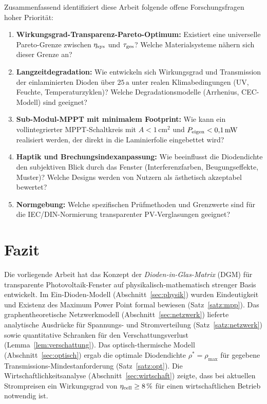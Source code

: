 ﻿\documentclass[a4paper,12pt]{article}
\theoremstyle{definition}
\theoremstyle{remark}
\begin{document}
Zusammenfassend identifiziert diese Arbeit folgende offene Forschungsfragen
hoher Priorität:

\begin{enumerate}
  \item \textbf{Wirkungsgrad-Transparenz-Pareto-Optimum:} Existiert eine
    universelle Pare\-to-Grenze zwischen $\eta_{\rm sys}$ und $\tau_{\rm ges}$?
    Welche Materialsysteme nähern sich dieser Grenze an?

  \item \textbf{Langzeitdegradation:} Wie entwickeln sich Wirkungsgrad
    und Transmission der einlaminierten Dioden über $25\,\mathrm{a}$
    unter realen Klimabedingungen (UV, Feuchte, Temperaturzyklen)?
    Welche Degradationsmodelle (Arrhenius, CEC-Modell) sind geeignet?

  \item \textbf{Sub-Modul-MPPT mit minimalem Footprint:} Wie kann ein
    vollintegrierter MPPT-Schaltkreis mit $A < 1\,\mathrm{cm^2}$
    und $P_{\rm eigen} < 0{,}1\,\mathrm{mW}$ realisiert werden,
    der direkt in die Laminierfolie eingebettet wird?

  \item \textbf{Haptik und Brechungsindexanpassung:} Wie beeinflusst
    die Diodendichte den subjektiven Blick durch das Fenster
    (Interferenzfarben, Beugungseffekte, Muster)? Welche Designs
    werden von Nutzern als ästhetisch akzeptabel bewertet?

  \item \textbf{Normgebung:} Welche spezifischen Prüfmethoden und
    Grenzwerte sind für die IEC/DIN-Normierung transparenter
    PV-Verglasungen geeignet?
\end{enumerate}

\section{Fazit}
\label{sec:fazit}

Die vorliegende Arbeit hat das Konzept der \emph{Dioden-in-Glas-Matrix}
(DGM) für transparente Photovoltaik-Fenster auf physikalisch-mathematisch
strenger Basis entwickelt. Im Ein-Dioden-Modell (Abschnitt~\ref{sec:physik})
wurden Eindeutigkeit und Existenz des Maximum Power Point formal bewiesen
(Satz~\ref{satz:mpp}). Das graphentheoretische Netzwerkmodell
(Abschnitt~\ref{sec:netzwerk}) lieferte analytische Ausdrücke für
Spannungs- und Stromverteilung (Satz~\ref{satz:netzwerk}) sowie
quantitative Schranken für den Verschattungsverlust
(Lemma~\ref{lem:verschattung}). Das optisch-thermische Modell
(Abschnitt~\ref{sec:optisch}) ergab die optimale Diodendichte
$\rho^* = \rho_{\max}$ für gegebene Transmissions-Mindestanforderung
(Satz~\ref{satz:opt}). Die Wirtschaftlichkeitsanalyse
(Abschnitt~\ref{sec:wirtschaft}) zeigte, dass bei aktuellen Strompreisen
ein Wirkungsgrad von $\eta_{\rm cell} \geq 8\,\%$ für einen wirtschaftlichen
Betrieb notwendig ist.
\end{document}
